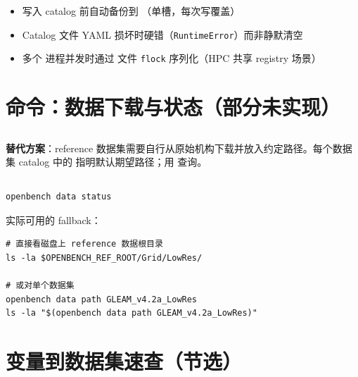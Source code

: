 \begin{itemize}
  \item 写入 catalog 前自动备份到 （单槽，每次写覆盖）
  \item Catalog 文件 YAML 损坏时硬错（\texttt{RuntimeError}）而非静默清空
  \item 多个  进程并发时通过  文件 \texttt{flock} 序列化（HPC 共享 registry 场景）
\end{itemize}

\section{命令：数据下载与状态（部分未实现）}

\subsection{}


\textbf{替代方案}：reference 数据集需要自行从原始机构下载并放入约定路径。每个数据集 catalog 中的  指明默认期望路径；用  查询。

\subsection{}

\begin{verbatim}
openbench data status
\end{verbatim}


实际可用的 fallback：

\begin{verbatim}
# 直接看磁盘上 reference 数据根目录
ls -la $OPENBENCH_REF_ROOT/Grid/LowRes/

# 或对单个数据集
openbench data path GLEAM_v4.2a_LowRes
ls -la "$(openbench data path GLEAM_v4.2a_LowRes)"
\end{verbatim}

\section{变量到数据集速查（节选）}

